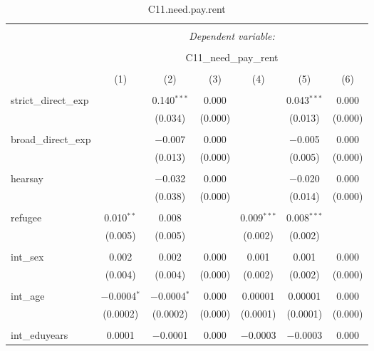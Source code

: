 
\begin{table}[H] \centering 
  \caption{C11.need.pay.rent} 
  \label{} 
\tiny 
\begin{tabular}{@{\extracolsep{4pt}}lcccccc} 
\\[-1.8ex]\hline 
\hline \\[-1.8ex] 
 & \multicolumn{6}{c}{\textit{Dependent variable:}} \\ 
\cline{2-7} 
\\[-1.8ex] & \multicolumn{6}{c}{C11\_need\_pay\_rent} \\ 
\\[-1.8ex] & (1) & (2) & (3) & (4) & (5) & (6)\\ 
\hline \\[-1.8ex] 
 strict\_direct\_exp &  & 0.140$^{***}$ & 0.000 &  & 0.043$^{***}$ & 0.000 \\ 
  &  & (0.034) & (0.000) &  & (0.013) & (0.000) \\ 
  & & & & & & \\ 
 broad\_direct\_exp &  & $-$0.007 & 0.000 &  & $-$0.005 & 0.000 \\ 
  &  & (0.013) & (0.000) &  & (0.005) & (0.000) \\ 
  & & & & & & \\ 
 hearsay &  & $-$0.032 & 0.000 &  & $-$0.020 & 0.000 \\ 
  &  & (0.038) & (0.000) &  & (0.014) & (0.000) \\ 
  & & & & & & \\ 
 refugee & 0.010$^{**}$ & 0.008 &  & 0.009$^{***}$ & 0.008$^{***}$ &  \\ 
  & (0.005) & (0.005) &  & (0.002) & (0.002) &  \\ 
  & & & & & & \\ 
 int\_sex & 0.002 & 0.002 & 0.000 & 0.001 & 0.001 & 0.000 \\ 
  & (0.004) & (0.004) & (0.000) & (0.002) & (0.002) & (0.000) \\ 
  & & & & & & \\ 
 int\_age & $-$0.0004$^{*}$ & $-$0.0004$^{*}$ & 0.000 & 0.00001 & 0.00001 & 0.000 \\ 
  & (0.0002) & (0.0002) & (0.000) & (0.0001) & (0.0001) & (0.000) \\ 
  & & & & & & \\ 
 int\_eduyears & 0.0001 & $-$0.0001 & 0.000 & $-$0.0003 & $-$0.0003 & 0.000 \\ 

\end{tabular}
\end{table}
